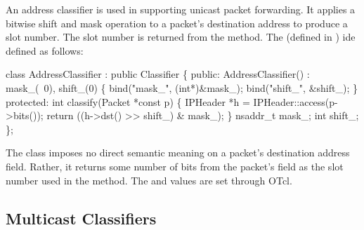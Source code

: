 An address classifier is used in supporting unicast packet forwarding.
It applies a bitwise shift and mask operation to a packet's destination
address to produce a slot number.
The slot number is returned from the  method.
The 
(defined in ) ide defined as follows:
\begin{program}
        class AddressClassifier : public Classifier \{
        public:
                AddressClassifier() : mask_(~0), shift_(0) \{
                        bind("mask_", (int*)&mask_);
                        bind("shift_", &shift_);
                \}
        protected:
                int classify(Packet *const p) \{
                        IPHeader *h = IPHeader::access(p->bits());
                        return ((h->dst() >> shift_) & mask_);
                \}
                nsaddr_t mask_;
                int shift_;
        \};
\end{program}
The class imposes no direct semantic meaning
on a packet's destination address field.
Rather, it returns some number of bits from the packet's
 field as the slot number used
in the  method.
The  and  values are set through OTcl.

\subsection{Multicast Classifiers}
\label{sec:node:mcast-classifier}

